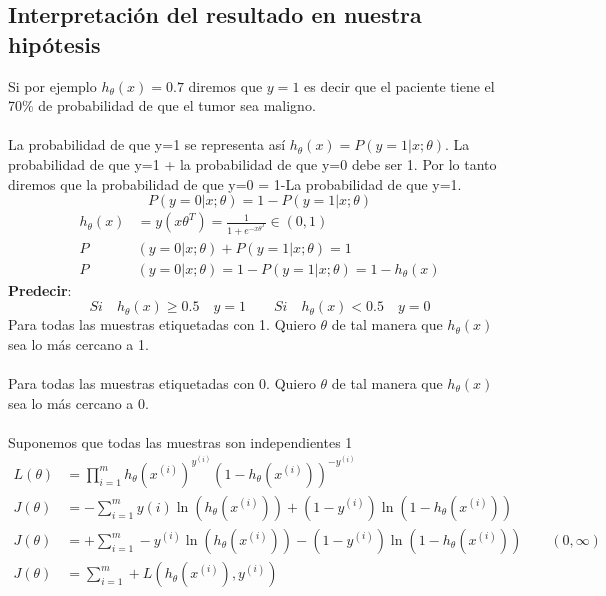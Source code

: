 \documentclass{report}
\begin{document}
\subsection{Interpretación del resultado en nuestra hipótesis}
Si por ejemplo $h_\theta(x)=0.7$ diremos que $ y=1 $ es decir que el paciente tiene el 70\% de probabilidad de que el tumor sea maligno.\\\\La probabilidad de que y=1 se representa así $ h_\theta(x)=P(y=1|x;\theta) $. La probabilidad de que y=1 + la probabilidad de que y=0 debe ser 1.  Por lo tanto diremos que la probabilidad de que y=0 = 1-La probabilidad de que y=1.
\begin{equation}
	P(y=0|x;\theta)=1-P(y=1|x;\theta)
\end{equation} 
\begin{align*}
h_\theta(x) &= y(x\theta^T)=\frac{1}{1+e^{-x\theta^T}} \in (0,1)\\
P&(y=0|x;\theta)+P(y=1|x;\theta)=1\\
P&(y=0|x;\theta)=1-P(y=1|x;\theta) = 1-h_\theta(x)
\end{align*}
\textbf{Predecir}:
\[
Si\quad h_\theta(x)\geq 0.5\quad y=1\qquad Si\quad h_\theta(x)<0.5\quad y=0
\]
Para todas las muestras etiquetadas con 1. Quiero $ \theta $ de tal manera que $ h_\theta(x) $ sea lo más cercano a 1.\\\\
Para todas las muestras etiquetadas con 0. Quiero $ \theta $ de tal manera que $ h_\theta(x) $ sea lo más cercano a 0.\\\\
Suponemos que todas las muestras son independientes 1
\begin{align*}
L(\theta)&=\prod_{i=1}^{m}h_\theta(x^{(i)})^{y^{(i)}}(1-h_\theta(x^{(i)}))^{-y^{(i)}}\\
J(\theta)&=-\sum_{i=1}^{m}y(i)\ln(h_\theta(x^{(i)}))+(1-y^{(i)})\ln(1-h_\theta(x^(i)))\\
J(\theta)&=+\sum_{i=1}^{m}-y^{(i)}\ln(h_\theta(x^{(i)}))-(1-y^{(i)})\ln(1-h_\theta(x^{(i)}))\qquad(0, \infty)\\
J(\theta)&=\sum_{i=1}^{m}+L(h_\theta(x^{(i)}), y^{(i)})
\end{align*}
\end{document}
